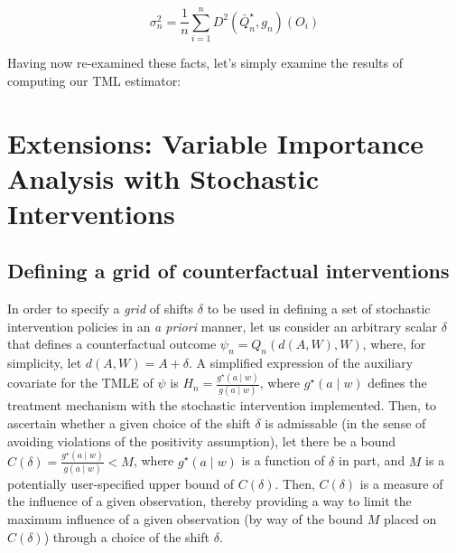 \documentclass[12pt, krantz2,]{krantz}
\theoremstyle{definition}
\theoremstyle{definition}
\theoremstyle{definition}
\newcommand{\1}{\mathbbm{1}}
\begin{document}
\[\sigma_n^2 = \frac{1}{n} \sum_{i = 1}^{n} D^2(\bar{Q}_n^{\star}, g_n)(O_i)\]

Having now re-examined these facts, let's simply examine the results of
computing our TML estimator:

\hypertarget{extensions-variable-importance-analysis-with-stochastic-interventions}{%
\section{Extensions: Variable Importance Analysis with Stochastic Interventions}\label{extensions-variable-importance-analysis-with-stochastic-interventions}}

\hypertarget{defining-a-grid-of-counterfactual-interventions}{%
\subsection{Defining a grid of counterfactual interventions}\label{defining-a-grid-of-counterfactual-interventions}}

In order to specify a \emph{grid} of shifts \(\delta\) to be used in defining a set of
stochastic intervention policies in an \emph{a priori} manner, let us consider an
arbitrary scalar \(\delta\) that defines a counterfactual outcome \(\psi_n = Q_n(d(A, W), W)\), where, for simplicity, let \(d(A, W) = A + \delta\). A
simplified expression of the auxiliary covariate for the TMLE of \(\psi\) is
\(H_n = \frac{g^{\star}(a \mid w)}{g(a \mid w)}\), where \(g^{\star}(a \mid w)\)
defines the treatment mechanism with the stochastic intervention implemented.
Then, to ascertain whether a given choice of the shift \(\delta\) is admissable
(in the sense of avoiding violations of the positivity assumption), let there
be a bound \(C(\delta) = \frac{g^{\star}(a \mid w)}{g(a \mid w)} < M\), where
\(g^{\star}(a \mid w)\) is a function of \(\delta\) in part, and \(M\) is a potentially
user-specified upper bound of \(C(\delta)\). Then, \(C(\delta)\) is a measure of
the influence of a given observation, thereby providing a way to limit the
maximum influence of a given observation (by way of the bound \(M\) placed on
\(C(\delta)\)) through a choice of the shift \(\delta\).
\end{document}
